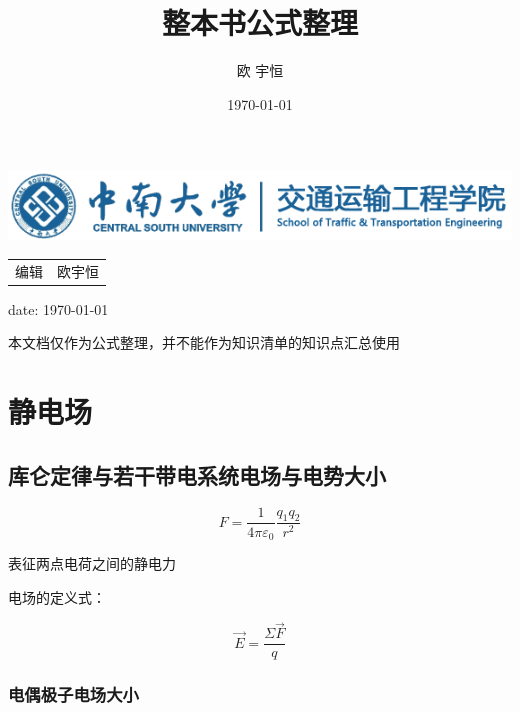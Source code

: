 \documentclass{ctexart}
\title{整本书公式整理}
\author{欧 宇恒}
\date{\today}
\begin{document}
	
\begin{center}
\includegraphics[scale=0.6]{images//logo.png} 

	\begin{spacing}{2.0}
		\kaishu {}
	\end{spacing}

	\begin{spacing}{1.5}
		\LARGE

		\begin{tabular}{r l}
		编辑& 欧宇恒\\
		\end{tabular}

		date: \today

		本文档仅作为公式整理，并不能作为知识清单的知识点汇总使用
	\end{spacing}
\end{center}

\newpage

\tableofcontents

\newpage

\section{静电场}

\subsection{库仑定律与若干带电系统电场与电势大小}

$$F=\frac{1}{4\pi \varepsilon_0}\frac{q_1q_2}{r^2}$$

表征两点电荷之间的静电力

电场的定义式：

$$\vec{E}=\frac{\Sigma \vec{F}}{q}$$



\subsubsection{电偶极子电场大小}
\end{document}
